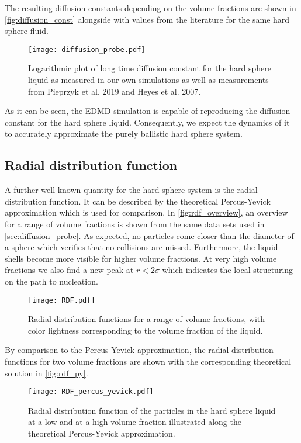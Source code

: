 The resulting diffusion constants depending on the volume fractions are shown in \autoref{fig:diffusion_const} alongside with values from the literature for the same hard sphere fluid.\\

\begin{figure}[h]
\centering
\texttt{[image: diffusion\_probe.pdf]}
\caption[Long time diffusion constant at varying volume fractions]{Logarithmic plot of long time diffusion constant for the hard sphere liquid as measured in our own simulations as well as measurements from Pieprzyk et al. 2019\cite{Pieprzyk2019} and Heyes et al. 2007\cite{Heyes2007}.}
\label{fig:diffusion_const}
\end{figure}

As it can be seen, the EDMD simulation is capable of reproducing the diffusion constant for the hard sphere liquid. Consequently, we expect the dynamics of it to accurately approximate the purely ballistic hard sphere system.
\FloatBarrier
\subsection{Radial distribution function}
\label{sec:RDF_prob}
A further well known quantity for the hard sphere system is the radial distribution function. It can be described by the theoretical Percus-Yevick approximation which is used for comparison. In \autoref{fig:rdf_overview}, an overview for a range of volume fractions is shown from the same data sets used in \autoref{sec:diffusion_probe}. As expected, no particles come closer than the diameter of a sphere which verifies that no collisions are missed. Furthermore, the liquid shells become more visible for higher volume fractions. At very high volume fractions we also find a new peak at $r < 2 \sigma$ which indicates the local structuring on the path to nucleation.
\begin{figure}[h]
\centering
\texttt{[image: RDF.pdf]}
\caption[Radial distribution functions at varying volume fractions]{Radial distribution functions for a range of volume fractions, with color lightness corresponding to the volume fraction of the liquid.}
\label{fig:rdf_overview}
\end{figure}
By comparison to the Percus-Yevick approximation, the radial distribution functions for two volume fractions are shown with the corresponding theoretical solution in \autoref{fig:rdf_py}.
\begin{figure}[h]
\centering
\texttt{[image: RDF\_percus\_yevick.pdf]}
\caption[Radial distribution function with Percus-Yevick approximation]{Radial distribution function of the particles in the hard sphere liquid at a low and at a high volume fraction illustrated along the theoretical Percus-Yevick approximation.}
\label{fig:rdf_py}
\end{figure}

